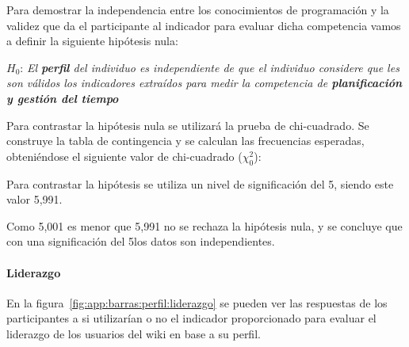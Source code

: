 Para demostrar la independencia entre los conocimientos de programación y la validez que da el participante al indicador para evaluar dicha competencia vamos a definir la siguiente hipótesis nula:

\begin{mdframed}[style=hipotesis0]
$H_0$: \emph{El \textbf{perfil} del individuo es independiente de que el individuo considere que les son válidos los indicadores extraídos para medir la competencia de \textbf{planificación y gestión del tiempo}}
\end{mdframed}

Para contrastar la hipótesis nula se utilizará la prueba de chi-cuadrado. Se construye la tabla de contingencia y se calculan las frecuencias esperadas, obteniéndose el siguiente valor de chi-cuadrado ($\chi^2_0$): 

\begin{center}
\end{center}

Para contrastar la hipótesis se utiliza un nivel de significación del 5\percentage, siendo este valor 5,991. 

\begin{center}
\end{center}

Como 5,001 es menor que 5,991 no se rechaza la hipótesis nula, y se concluye que con una significación del 5\percentage  los datos son independientes.

\begin{center}
\end{center}

\paragraph*{Liderazgo}
 
En la figura~\ref{fig:app:barras:perfil:liderazgo} se pueden ver las respuestas de los participantes a si utilizarían o no el indicador proporcionado para evaluar el liderazgo de los usuarios del wiki en base a su perfil.

